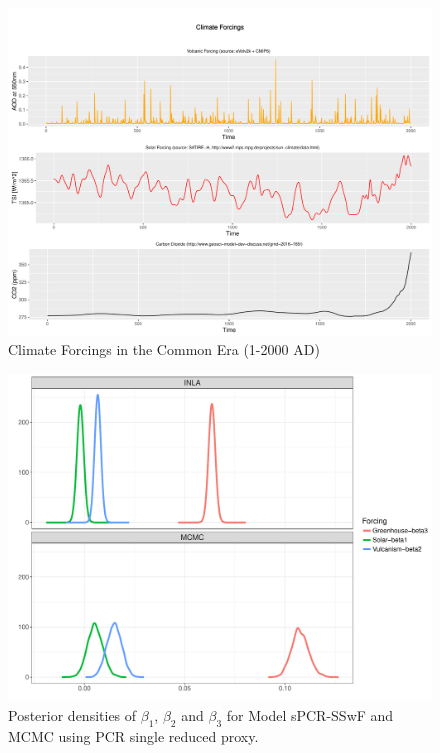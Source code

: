 \documentclass[11pt]{amsart}
\theoremstyle{plain}
\theoremstyle{definition}
\theoremstyle{remark}
\begin{document}
\begin{figure}[H]
  \centering
  \includegraphics[scale=0.35]{forcings}
  \caption{Climate Forcings in the Common Era (1-2000 AD)}
  \label{fig:forcings}
\end{figure}

\begin{figure}[H]
  \centering
  \includegraphics[scale=0.45]{PlotBetas}
  \caption{Posterior densities of $\beta_1$, $\beta_2$ and $\beta_3$ for Model
    sPCR-SSwF and MCMC using PCR single reduced proxy.}
  \label{fig:betas}
\end{figure}

\end{document}
